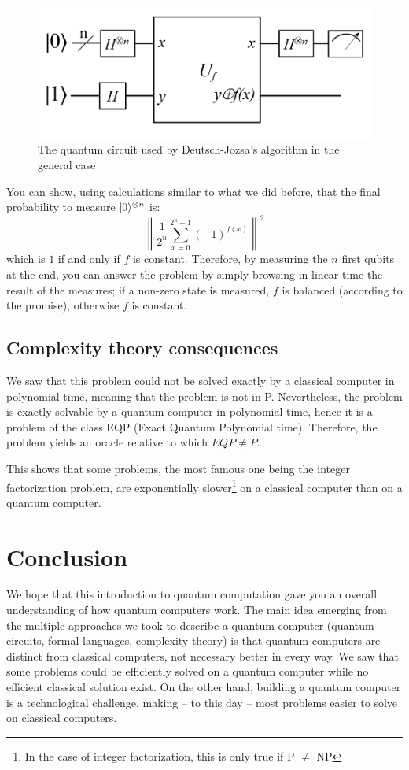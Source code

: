 \documentclass[12pt,a4paper]{article}
\theoremstyle{plain}
\theoremstyle{definition}
\DeclarePairedDelimiter\ket{\lvert}{\rangle}
\begin{document}
\begin{figure}[!ht]
    \centering
    \includegraphics*[scale=0.4]{deutsch-circuit-n.png}
    \caption{The quantum circuit used by Deutsch-Jozsa's algorithm in the general case}
\end{figure}

You can show, using calculations similar to what we did before, that the final probability to measure $\ket{0}^{\otimes n}$ is:
\begin{equation*}
    \left\|\frac{1}{2^n}\sum_{x=0}^{2^n-1}(-1)^{f(x)}\right\|^2
\end{equation*}
which is $1$ if and only if $f$ is constant.
Therefore, by measuring the $n$ first qubits at the end, you can answer the problem by simply browsing in linear time the result of the measures; if a non-zero state is measured, $f$ is balanced (according to the promise), otherwise $f$ is constant.


\subsection{Complexity theory consequences}
We saw that this problem could not be solved exactly by a classical computer in polynomial time, meaning that the problem is not in P. Nevertheless, the problem is exactly solvable by a quantum computer in polynomial time, hence it is a problem of the class EQP (Exact Quantum Polynomial time). Therefore, the problem yields an oracle relative to which $EQP \neq P$.

This shows that some problems, the most famous one being the integer factorization problem, are exponentially slower\footnote{In the case of integer factorization, this is only true if P $\neq$ NP} on a classical computer than on a quantum computer.

\section*{Conclusion}
We hope that this introduction to quantum computation gave you an overall understanding of how quantum computers work. The main idea emerging from the multiple approaches we took to describe a quantum computer (quantum circuits, formal languages, complexity theory) is that quantum computers are distinct from classical computers, not necessary better in every way. We saw that some problems could be efficiently solved on a quantum computer while no efficient classical solution exist. On the other hand, building a quantum computer is a technological challenge, making -- to this day -- most problems easier to solve on classical computers.
\end{document}
